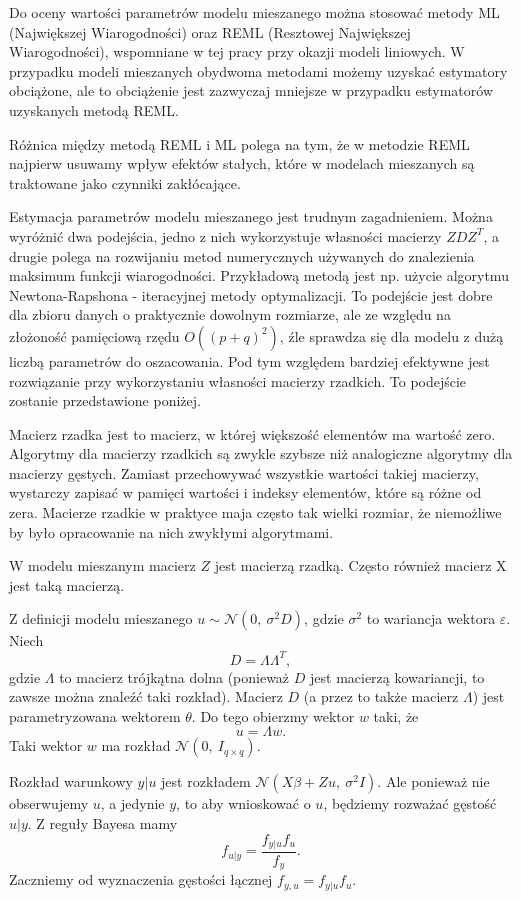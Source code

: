 \documentclass[12pt]{mwbk}
\theoremstyle{plain}
\theoremstyle{definition}
\theoremstyle{remark}
\begin{document}
Do oceny wartości parametrów modelu mieszanego można stosować metody ML (Największej Wiarogodności) oraz REML (Resztowej Największej Wiarogodności), wspomniane w tej pracy przy okazji modeli liniowych. W przypadku modeli mieszanych obydwoma metodami możemy uzyskać estymatory obciążone, ale to obciążenie jest zazwyczaj mniejsze w przypadku estymatorów uzyskanych metodą REML.

Różnica między metodą REML i ML polega na tym, że w metodzie REML najpierw usuwamy wpływ efektów stałych, które w modelach mieszanych są traktowane jako czynniki zakłócające.

Estymacja parametrów modelu mieszanego jest trudnym zagadnieniem. Można wyróżnić dwa podejścia, jedno z nich wykorzystuje własności macierzy $ZDZ^T$, a drugie polega na rozwijaniu metod numerycznych używanych do znalezienia maksimum funkcji wiarogodności. Przykładową metodą jest np. użycie algorytmu Newtona-Rapshona - iteracyjnej metody optymalizacji. To podejście jest dobre dla zbioru danych o praktycznie dowolnym rozmiarze, ale ze względu na złożoność pamięciową rzędu $O((p+q)^2)$, źle sprawdza się dla modelu z dużą liczbą parametrów do oszacowania. Pod tym względem bardziej efektywne jest rozwiązanie przy wykorzystaniu własności macierzy rzadkich. To podejście zostanie przedstawione poniżej.

Macierz rzadka jest to macierz, w której większość elementów ma wartość zero. Algorytmy dla macierzy rzadkich są zwykle szybsze niż analogiczne algorytmy dla macierzy gęstych. Zamiast przechowywać wszystkie wartości takiej macierzy, wystarczy zapisać w pamięci wartości i indeksy elementów, które są różne od zera. Macierze rzadkie w praktyce maja często tak wielki rozmiar, że niemożliwe by było opracowanie na nich zwykłymi algorytmami.

W modelu mieszanym macierz $Z$ jest macierzą rzadką. Często również macierz X jest taką macierzą.

Z definicji modelu mieszanego $u \sim \mathcal{N}(0,~\sigma^2D)$, gdzie $\sigma^2$ to wariancja wektora $\varepsilon$. Niech $$D=\Lambda \Lambda^T,$$ gdzie $\Lambda$ to macierz trójkątna dolna (ponieważ $D$ jest macierzą kowariancji, to zawsze można znaleźć taki rozkład). Macierz $D$ (a przez to także macierz $\Lambda$) jest parametryzowana wektorem $\theta$. Do tego obierzmy wektor $w$ taki, że $$u=\Lambda w.$$ Taki wektor $w$ ma rozkład $\mathcal{N}(0,~I_{q \times q})$.

Rozkład warunkowy $y|u$ jest rozkładem $\mathcal{N}(X\beta+Zu,~\sigma^2I)$. Ale ponieważ nie obserwujemy $u$, a jedynie $y$, to aby wnioskować o $u$, będziemy rozważać gęstość $u|y$. Z reguły Bayesa mamy $$f_{u|y}=\frac{f_{y|u}f_u}{f_y}.$$ Zaczniemy od wyznaczenia gęstości łącznej $f_{y,u}=f_{y|u}f_u$.
\end{document}
